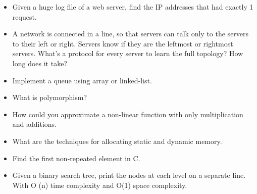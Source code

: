 \documentclass{article}
\begin{document}
\begin{itemize}
	\item Given a huge log file of a web server, find the IP addresses that had exactly 1 request.
	\item A network is connected in a line, so that servers can talk only to the servers to their left or right. Servers know if they are the leftmost or rightmost servers. What's a protocol for every server to learn the full topology? How long does it take?
	\item Implement a queue using array or linked-list.
	\item What is polymorphism?
	\item How could you approximate a non-linear function with only multiplication and additions. 
	\item What are the techniques for allocating static and dynamic memory.
	\item Find the first non-repeated element in C.
	\item Given a binary search tree, print the nodes at each level on a separate line. With O (n) time complexity and O(1) space complexity.
\end{itemize}
\end{document}

